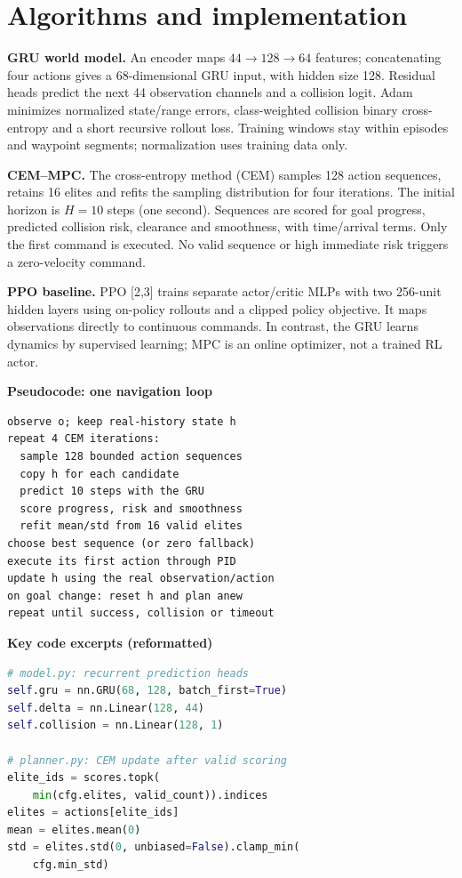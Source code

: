 \documentclass[10pt,a4paper]{article}
\begin{document}
\section{Algorithms and implementation}
\textbf{GRU world model.} An encoder maps $44\!\to\!128\!\to\!64$ features; concatenating four actions gives a 68-dimensional GRU input, with hidden size 128. Residual heads predict the next 44 observation channels and a collision logit. Adam minimizes normalized state/range errors, class-weighted collision binary cross-entropy and a short recursive rollout loss. Training windows stay within episodes and waypoint segments; normalization uses training data only.

\textbf{CEM--MPC.} The cross-entropy method (CEM) samples 128 action sequences, retains 16 elites and refits the sampling distribution for four iterations. The initial horizon is $H=10$ steps (one second). Sequences are scored for goal progress, predicted collision risk, clearance and smoothness, with time/arrival terms. Only the first command is executed. No valid sequence or high immediate risk triggers a zero-velocity command.

\textbf{PPO baseline.} PPO [2,3] trains separate actor/critic MLPs with two 256-unit hidden layers using on-policy rollouts and a clipped policy objective. It maps observations directly to continuous commands. In contrast, the GRU learns dynamics by supervised learning; MPC is an online optimizer, not a trained RL actor.

\begin{minipage}[t]{0.485\linewidth}
\textbf{Pseudocode: one navigation loop}
\begin{lstlisting}[style=compact]
observe o; keep real-history state h
repeat 4 CEM iterations:
  sample 128 bounded action sequences
  copy h for each candidate
  predict 10 steps with the GRU
  score progress, risk and smoothness
  refit mean/std from 16 valid elites
choose best sequence (or zero fallback)
execute its first action through PID
update h using the real observation/action
on goal change: reset h and plan anew
repeat until success, collision or timeout
\end{lstlisting}
\end{minipage}\hfill
\begin{minipage}[t]{0.485\linewidth}
\textbf{Key code excerpts (reformatted)}
\begin{lstlisting}[style=compact,language=Python]
# model.py: recurrent prediction heads
self.gru = nn.GRU(68, 128, batch_first=True)
self.delta = nn.Linear(128, 44)
self.collision = nn.Linear(128, 1)

# planner.py: CEM update after valid scoring
elite_ids = scores.topk(
    min(cfg.elites, valid_count)).indices
elites = actions[elite_ids]
mean = elites.mean(0)
std = elites.std(0, unbiased=False).clamp_min(
    cfg.min_std)
\end{lstlisting}
\end{minipage}
\end{document}
